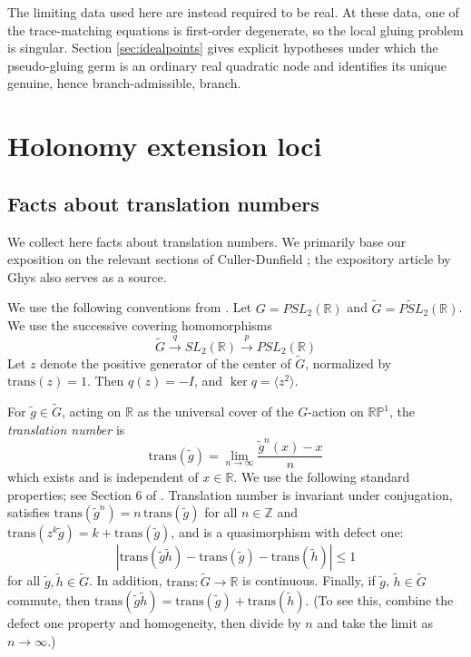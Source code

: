 \documentclass{article}
\theoremstyle{plain}
\theoremstyle{definition}
\theoremstyle{plain}
\theoremstyle{plain}
\theoremstyle{plain}
\theoremstyle{remark}
\theoremstyle{remark}
\theoremstyle{plain}
\theoremstyle{plain}
\theoremstyle{plain}
\theoremstyle{plain}
\begin{document}
\medskip

The limiting data used here are instead required to be real. At these data, one of the trace-matching equations is first-order degenerate, so the local gluing problem is singular. Section \ref{sec:idealpoints} gives explicit hypotheses under which the pseudo-gluing germ is an ordinary real quadratic node and identifies its unique genuine, hence branch-admissible, branch.

\section{Holonomy extension loci}\label{sec:h00}

\subsection{Facts about translation numbers}

We collect here facts about translation numbers. We primarily base our exposition on the relevant sections of Culler-Dunfield \cite{cullerdunfield}; the expository article by Ghys \cite{ghys} also serves as a source. 

\medskip

We use the following conventions from \cite{cullerdunfield}. Let $G = PSL_2(\mathbb{R})$ and $\widetilde{G} = \widetilde{PSL}_2(\mathbb{R})$. We use the successive covering homomorphisms
\begin{equation*}
	\widetilde{G} \xrightarrow{q} SL_2(\mathbb{R}) \xrightarrow{p} PSL_2(\mathbb{R})
\end{equation*}
Let $z$ denote the positive generator of the center of $\widetilde{G}$, normalized by $\mathrm{trans}(z) = 1$. Then $q(z) = -I$, and $\ker q = \langle z^2 \rangle$.

\medskip

For $\widetilde{g} \in \widetilde{G}$, acting on $\mathbb{R}$ as the universal cover of the $G$-action on $\mathbb{RP}^1$, the \emph{translation number} is
\begin{equation*}
	\mathrm{trans}(\widetilde{g}) = \lim_{n \to \infty}\frac{\widetilde{g}^n(x) - x}{n}
\end{equation*}
which exists and is independent of $x \in \mathbb{R}$. We use the following standard properties; see Section 6 of \cite{ghys}. Translation number is invariant under conjugation, satisfies $\mathrm{trans}(\widetilde{g}^n) = n\,\mathrm{trans}(\widetilde{g})$ for all $n \in \mathbb{Z}$ and $\mathrm{trans}(z^k\widetilde{g}) = k + \mathrm{trans}(\widetilde{g})$, and is a quasimorphism with defect one:
\begin{equation*}
	|\mathrm{trans}(\widetilde{g}\widetilde{h}) - \mathrm{trans}(\widetilde{g}) - \mathrm{trans}(\widetilde{h})| \leq 1
\end{equation*}
for all $\widetilde{g}, \widetilde{h} \in \widetilde{G}$. In addition, $\mathrm{trans}: \widetilde G \to \mathbb{R}$ is continuous. Finally, if $\widetilde g$, $\widetilde h \in \widetilde G$ commute, then $\mathrm{trans}(\widetilde g\widetilde h) = \mathrm{trans}(\widetilde g) + \mathrm{trans}(\widetilde h)$. (To see this, combine the defect one property and homogeneity, then divide by $n$ and take the limit as $n \to \infty$.)
\end{document}
